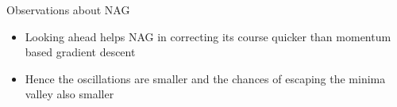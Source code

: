\begin{frame}
\end{frame}

\begin{frame}
	\begin{overlayarea}{\textwidth}{\textheight}
		\begin{block}{Observations about NAG}
			\begin{itemize}\justifying
				\item<1-> Looking ahead helps NAG in correcting its course quicker than momentum based gradient descent
				\item<2-> Hence the oscillations are smaller and the chances of escaping the minima valley also smaller
			\end{itemize}
		\end{block}
	\end{overlayarea}
\end{frame}
